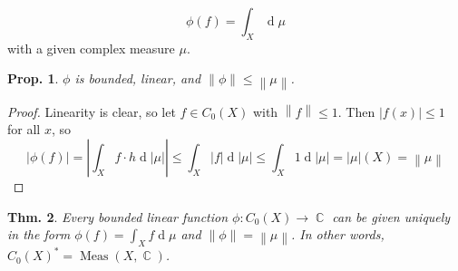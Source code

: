 \documentclass[12pt, a4paper]{book}
\DeclareMathOperator{\C}{\mathbb{C}}
\renewcommand{\d}[1]{\ensuremath{\operatorname{d}\!{#1}}} %
\newcommand{\norm}[1]{\left\lVert#1\right\rVert} %
\newtheorem{theorem}{Thm.}[section]
\newtheorem{proposition}[theorem]{Prop.}
\theoremstyle{nonumberplain}
\newtheorem{proof}{Proof}
\begin{document}
\[\phi(f)=\int_X \d{\mu}\]
with a given complex measure $\mu$.
\begin{proposition}
    $\phi$ is bounded, linear, and $\norm{\phi}\leq\norm{\mu}$.
\end{proposition}
\begin{proof}
    Linearity is clear, so let $f\in C_0(X)$ with $\norm{f}\leq 1$.
    Then $|f(x)|\leq 1$ for all $x$, so
    \begin{equation*}|\phi(f)|=\left\lvert\int_X f\cdot h\d{|\mu|}\right\rvert\leq\int_X|f|\d{|\mu|}\leq\int_X 1\d{|\mu|}=|\mu|(X)=\norm{\mu}\end{equation*}
\end{proof}
\begin{theorem}
    Every bounded linear function $\phi:C_0(X)\to\C$ can be given uniquely in the form $\phi(f)=\int_X f\d{\mu}$ and $\norm{\phi}=\norm{\mu}$.
    In other words, $C_0(X)^*=\operatorname{Meas}(X,\C)$.
\end{theorem}
\end{document}
